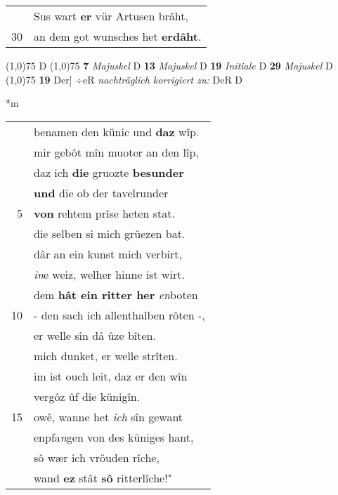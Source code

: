 \documentclass[8pt,a4paper,notitlepage]{article}
\begin{document}
\begin{table}[ht]
\begin{minipage}[t]{0.5\linewidth}
\begin{tabular}{rl}
 & Sus wart \textbf{er} vür Artusen brâht,\\ 
30 & an dem got wunsches het \textbf{erdâht}.\\ 
\end{tabular}
\scriptsize
\line(1,0){75} \newline
D \newline
\line(1,0){75} \newline
\textbf{7} \textit{Majuskel} D  \textbf{13} \textit{Majuskel} D  \textbf{19} \textit{Initiale} D  \textbf{29} \textit{Majuskel} D  \newline
\line(1,0){75} \newline
\textbf{19} Der] ÷eR \textit{nachträglich korrigiert zu:} DeR D \newline
\end{minipage}
\hspace{0.5cm}
\begin{minipage}[t]{0.5\linewidth}
\small
\begin{center}*m
\end{center}
\begin{tabular}{rl}
 & benamen den künic und \textbf{daz} wîp.\\ 
 & mir gebôt mîn muoter an den lîp,\\ 
 & daz ich \textbf{die} gruozte \textbf{besunder}\\ 
 & \textbf{und} die ob der tavelrunder\\ 
5 & \textbf{von} rehtem prîse heten stat.\\ 
 & die selben si mich grüezen bat.\\ 
 & dâr an ein kunst mich verbirt,\\ 
 & \textit{in}e weiz, welher hinne ist wirt.\\ 
 & dem \textbf{hât ein ritter her} \textit{en}boten\\ 
10 & - den sach ich allenthalben rôten -,\\ 
 & er welle sîn dâ ûze bîten.\\ 
 & mich dunket, er welle strîten.\\ 
 & im ist ouch leit, daz er den wîn\\ 
 & vergôz ûf die künigîn.\\ 
15 & owê, wanne het \textit{ich} sîn gewant\\ 
 & enpfa\textit{n}gen von des küniges hant,\\ 
 & sô wær ich vröuden rîche,\\ 
 & wand \textbf{ez} stât \textbf{sô} ritterlîche!"\\ 

\end{tabular}
\end{minipage}
\end{table}
\end{document}
